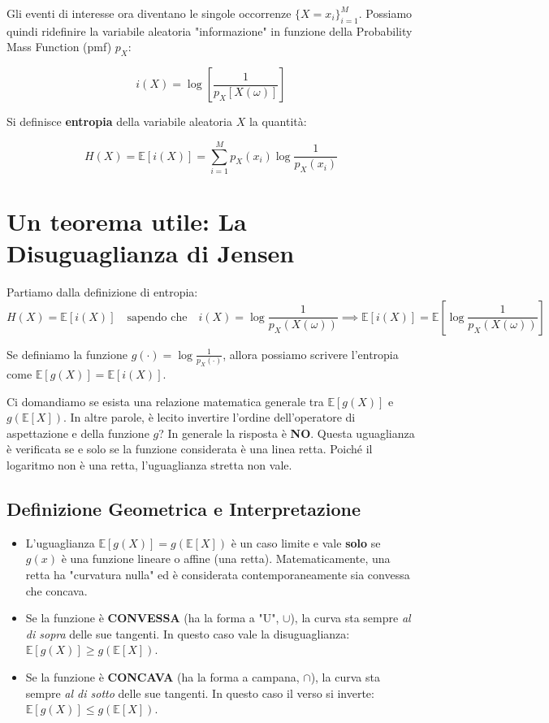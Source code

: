 Gli eventi di interesse ora diventano le singole occorrenze $\{X = x_i\}_{i=1}^M$.
Possiamo quindi ridefinire la variabile aleatoria "informazione" in funzione della Probability Mass Function (pmf) $p_X$:

\begin{equation}
i(X) = \log \left[ \frac{1}{p_X[X(\omega)]} \right]
\end{equation}

Si definisce \textbf{entropia} della variabile aleatoria $X$ la quantità:

\begin{equation}
\boxed{ H(X) = \mathbb{E}[i(X)] = \sum_{i=1}^{M} p_X(x_i) \log \frac{1}{p_X(x_i)} }
\end{equation}

\section{Un teorema utile: La Disuguaglianza di Jensen}

Partiamo dalla definizione di entropia:
\begin{equation}
H(X) = \mathbb{E}[i(X)] \quad \text{sapendo che} \quad i(X) = \log \frac{1}{p_X(X(\omega))} \implies \mathbb{E}[i(X)] = \mathbb{E}\left[\log \frac{1}{p_X(X(\omega))}\right]
\end{equation}

Se definiamo la funzione $g(\cdot) = \log \frac{1}{p_X(\cdot)}$, allora possiamo scrivere l'entropia come $\mathbb{E}[g(X)] = \mathbb{E}[i(X)]$.

Ci domandiamo se esista una relazione matematica generale tra $\mathbb{E}[g(X)]$ e $g(\mathbb{E}[X])$. In altre parole, è lecito invertire l'ordine dell'operatore di aspettazione e della funzione $g$? 
In generale la risposta è \textbf{NO}. Questa uguaglianza è verificata se e solo se la funzione considerata è una linea retta. Poiché il logaritmo non è una retta, l'uguaglianza stretta non vale.

\subsection{Definizione Geometrica e Interpretazione}

\begin{itemize}
    \item L'uguaglianza $\mathbb{E}[g(X)] = g(\mathbb{E}[X])$ è un caso limite e vale \textbf{solo} se $g(x)$ è una funzione lineare o affine (una retta). Matematicamente, una retta ha "curvatura nulla" ed è considerata contemporaneamente sia convessa che concava.
    \item Se la funzione è \textbf{CONVESSA} (ha la forma a "U", $\cup$), la curva sta sempre \textit{al di sopra} delle sue tangenti. In questo caso vale la disuguaglianza: $\mathbb{E}[g(X)] \ge g(\mathbb{E}[X])$.
    \item Se la funzione è \textbf{CONCAVA} (ha la forma a campana, $\cap$), la curva sta sempre \textit{al di sotto} delle sue tangenti. In questo caso il verso si inverte: $\mathbb{E}[g(X)] \le g(\mathbb{E}[X])$.
\end{itemize}

